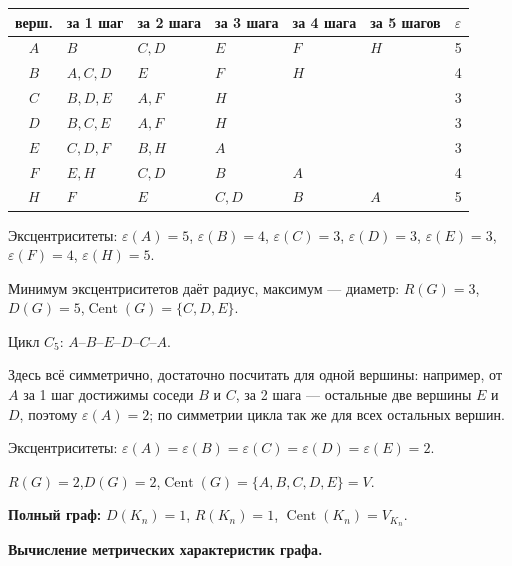 \medskip
\begin{center}
\begin{tabular}{c|l|l|l|l|l|c}
  верш. & за 1 шаг & за 2 шага & за 3 шага & за 4 шага & за 5 шагов & $\varepsilon$ \\ \hline
  $A$ & $B$       & $C, D$    & $E$       & $F$ & $H$ & 5 \\
  $B$ & $A, C, D$ & $E$       & $F$       & $H$ &     & 4 \\
  $C$ & $B, D, E$ & $A, F$    & $H$       &     &     & 3 \\
  $D$ & $B, C, E$ & $A, F$    & $H$       &     &     & 3 \\
  $E$ & $C, D, F$ & $B, H$    & $A$       &     &     & 3 \\
  $F$ & $E, H$    & $C, D$    & $B$       & $A$ &     & 4 \\
  $H$ & $F$       & $E$       & $C, D$    & $B$ & $A$ & 5 \\
\end{tabular}
\end{center}

\medskip
Эксцентриситеты:
$\varepsilon(A) = 5$,\;
$\varepsilon(B) = 4$,\;
$\varepsilon(C) = 3$,\;
$\varepsilon(D) = 3$,\;
$\varepsilon(E) = 3$,\;
$\varepsilon(F) = 4$,\;
$\varepsilon(H) = 5$.

Минимум эксцентриситетов даёт радиус, максимум --- диаметр:
$R(G) = 3$,\quad $D(G) = 5$,\quad $\operatorname{Cent}(G) = \{C, D, E\}$.

\medskip

Цикл $C_5$: $A$--$B$--$E$--$D$--$C$--$A$.

Здесь всё симметрично, достаточно посчитать для одной вершины: например,
от $A$ за 1 шаг достижимы соседи $B$ и $C$, за 2 шага --- остальные две
вершины $E$ и $D$, поэтому $\varepsilon(A) = 2$; по симметрии цикла так же
для всех остальных вершин.

Эксцентриситеты: $\varepsilon(A) = \varepsilon(B) = \varepsilon(C) = \varepsilon(D) = \varepsilon(E) = 2$.

$R(G) = 2$,\quad $D(G) = 2$,\quad $\operatorname{Cent}(G) = \{A, B, C, D, E\} = V$.

\medskip
\textbf{Полный граф:}
$D(K_n) = 1$,\; $R(K_n) = 1$,\; $\operatorname{Cent}(K_n) = V_{K_n}$.

\bigskip
\textbf{Вычисление метрических характеристик графа.}

